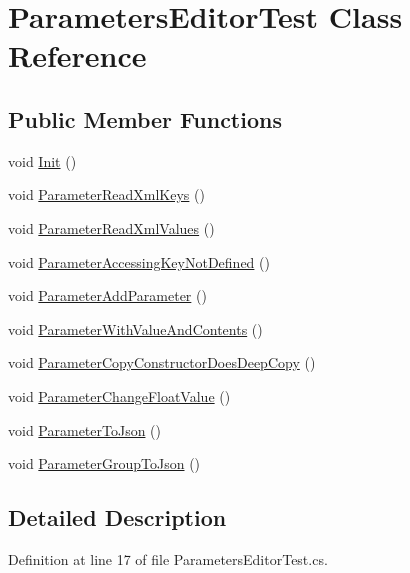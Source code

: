 \hypertarget{class_parameters_editor_test}{}\section{Parameters\+Editor\+Test Class Reference}
\label{class_parameters_editor_test}
\subsection*{Public Member Functions}
\begin{DoxyCompactItemize}
\item 
void \hyperlink{class_parameters_editor_test_a6cbf726c531792842d88ded8ee0701ba}{Init} ()
\item 
void \hyperlink{class_parameters_editor_test_a6898c4091b4e195b02c3a70738fb394e}{Parameter\+Read\+Xml\+Keys} ()
\item 
void \hyperlink{class_parameters_editor_test_a52328474e8650852f576fb44dd4a55d7}{Parameter\+Read\+Xml\+Values} ()
\item 
void \hyperlink{class_parameters_editor_test_ad134faa26742d8a6e2a5d4eae499dd63}{Parameter\+Accessing\+Key\+Not\+Defined} ()
\item 
void \hyperlink{class_parameters_editor_test_a6d8b9228dedd1ba69d56a2062cbc49d1}{Parameter\+Add\+Parameter} ()
\item 
void \hyperlink{class_parameters_editor_test_ac13921acfbf1e03f2b30b02b4dba5934}{Parameter\+With\+Value\+And\+Contents} ()
\item 
void \hyperlink{class_parameters_editor_test_a8022a5463979a4dc3cf871e4aecbd855}{Parameter\+Copy\+Constructor\+Does\+Deep\+Copy} ()
\item 
void \hyperlink{class_parameters_editor_test_a391c5b1356aebf4588b7494e32a30f4d}{Parameter\+Change\+Float\+Value} ()
\item 
void \hyperlink{class_parameters_editor_test_a12bcf53ee74ca0bc1ccf0faa4e17c7c4}{Parameter\+To\+Json} ()
\item 
void \hyperlink{class_parameters_editor_test_a4f3ede0f43bd45f908e764f7f8a39550}{Parameter\+Group\+To\+Json} ()
\end{DoxyCompactItemize}


\subsection{Detailed Description}


Definition at line 17 of file Parameters\+Editor\+Test.\+cs.



